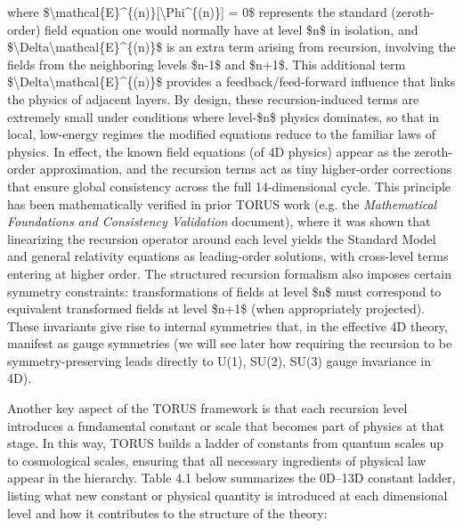 \documentclass[
]{article}
\begin{document}
where
\$\textbackslash mathcal\{E\}\^{}\{(n)\}{[}\textbackslash Phi\^{}\{(n)\}{]}
= 0\$ represents the standard (zeroth-order) field equation one would
normally have at level \$n\$ in isolation, and
\$\textbackslash Delta\textbackslash mathcal\{E\}\^{}\{(n)\}\$ is an
extra term arising from recursion, involving the fields from the
neighboring levels \$n-1\$ and \$n+1\$. This additional term
\$\textbackslash Delta\textbackslash mathcal\{E\}\^{}\{(n)\}\$ provides
a feedback/feed-forward influence that links the physics of adjacent
layers. By design, these recursion-induced terms are extremely small
under conditions where level-\$n\$ physics dominates, so that in local,
low-energy regimes the modified equations reduce to the familiar laws of
physics. In effect, the known field equations (of 4D physics) appear as
the zeroth-order approximation, and the recursion terms act as tiny
higher-order corrections that ensure global consistency across the full
14-dimensional cycle. This principle has been mathematically verified in
prior TORUS work (e.g. the \emph{Mathematical Foundations and
Consistency Validation} document), where it was shown that linearizing
the recursion operator around each level yields the Standard Model and
general relativity equations as leading-order solutions, with
cross-level terms entering at higher order. The structured recursion
formalism also imposes certain symmetry constraints: transformations of
fields at level \$n\$ must correspond to equivalent transformed fields
at level \$n+1\$ (when appropriately projected). These invariants give
rise to internal symmetries that, in the effective 4D theory, manifest
as gauge symmetries (we will see later how requiring the recursion to be
symmetry-preserving leads directly to U(1), SU(2), SU(3) gauge
invariance in 4D).

Another key aspect of the TORUS framework is that each recursion level
introduces a fundamental constant or scale that becomes part of physics
at that stage. In this way, TORUS builds a ladder of constants from
quantum scales up to cosmological scales, ensuring that all necessary
ingredients of physical law appear in the hierarchy. Table 4.1 below
summarizes the 0D--13D constant ladder, listing what new constant or
physical quantity is introduced at each dimensional level and how it
contributes to the structure of the theory:
\end{document}
